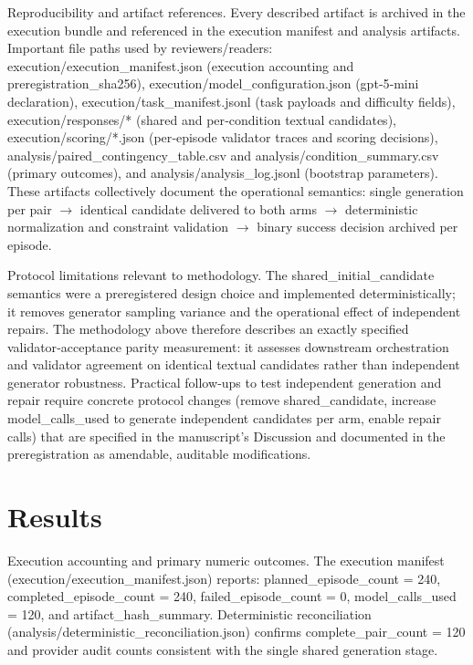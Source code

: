 \documentclass[conference]{IEEEtran}
\begin{document}
Reproducibility and artifact references. Every described artifact is archived in the execution bundle and referenced in the execution manifest and analysis artifacts. Important file paths used by reviewers/readers: execution/execution\_manifest.json (execution accounting and preregistration\_sha256), execution/model\_configuration.json (gpt‑5‑mini declaration), execution/task\_manifest.jsonl (task payloads and difficulty fields), execution/responses/* (shared and per‑condition textual candidates), execution/scoring/*.json (per‑episode validator traces and scoring decisions), analysis/paired\_contingency\_table.csv and analysis/condition\_summary.csv (primary outcomes), and analysis/analysis\_log.jsonl (bootstrap parameters). These artifacts collectively document the operational semantics: single generation per pair \ensuremath{\rightarrow} identical candidate delivered to both arms \ensuremath{\rightarrow} deterministic normalization and constraint validation \ensuremath{\rightarrow} binary success decision archived per episode.

Protocol limitations relevant to methodology. The shared\_initial\_candidate semantics were a preregistered design choice and implemented deterministically; it removes generator sampling variance and the operational effect of independent repairs. The methodology above therefore describes an exactly specified validator‑acceptance parity measurement: it assesses downstream orchestration and validator agreement on identical textual candidates rather than independent generator robustness. Practical follow‑ups to test independent generation and repair require concrete protocol changes (remove shared\_candidate, increase model\_calls\_used to generate independent candidates per arm, enable repair calls) that are specified in the manuscript's Discussion and documented in the preregistration as amendable, auditable modifications.

\section{Results}
Execution accounting and primary numeric outcomes. The execution manifest (execution/execution\_manifest.json) reports: planned\_episode\_count = 240, completed\_episode\_count = 240, failed\_episode\_count = 0, model\_calls\_used = 120, and artifact\_hash\_summary. Deterministic reconciliation (analysis/deterministic\_reconciliation.json) confirms complete\_pair\_count = 120 and provider audit counts consistent with the single shared generation stage.
\end{document}
